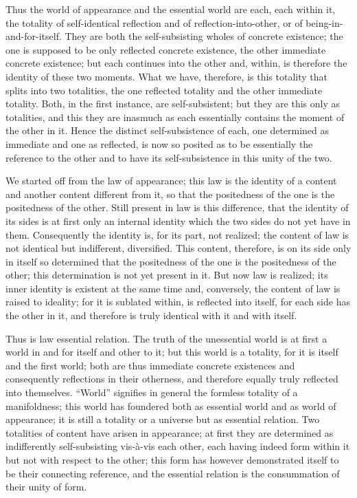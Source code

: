 Thus the world of appearance and the essential world are
each, each within it, the totality of
self-identical reflection and of reflection-into-other,
or of being-in-and-for-itself.
They are both the self-subsisting wholes of concrete existence;
the one is supposed to be only reflected concrete existence,
the other immediate concrete existence;
but each continues into the other and, within, is
therefore the identity of these two moments.
What we have, therefore, is this totality
that splits into two totalities,
the one reflected totality and the other immediate totality.
Both, in the first instance, are self-subsistent;
but they are this only as totalities,
and this they are inasmuch as each essentially contains
the moment of the other in it.
Hence the distinct self-subsistence of each,
one determined as immediate and one as reflected,
is now so posited as to be essentially the reference to the other
and to have its self-subsistence in this unity of the two.

We started off from the law of appearance;
this law is the identity of a content and another content different from it,
so that the positedness of the one is the positedness of the other.
Still present in law is this difference,
that the identity of its sides is at first only an internal identity
which the two sides do not yet have in them.
Consequently the identity is, for its part, not realized;
the content of law is not identical but indifferent, diversified.
This content, therefore, is on its side only in itself so determined
that the positedness of the one is the positedness of the other;
this determination is not yet present in it.
But now law is realized; its inner identity is existent at the same time
and, conversely, the content of law is raised to ideality;
for it is sublated within, is reflected into itself,
for each side has the other in it,
and therefore is truly identical with it and with itself.

Thus is law essential relation.
The truth of the unessential world is at first
a world in and for itself and other to it;
but this world is a totality,
for it is itself and the first world;
both are thus immediate concrete existences
and consequently reflections in their otherness,
and therefore equally truly reflected into themselves.
“World” signifies in general the formless totality of a manifoldness;
this world has foundered both as essential world and as world of appearance;
it is still a totality or a universe but as essential relation.
Two totalities of content have arisen in appearance;
at first they are determined as
indifferently self-subsisting vis-à-vis each other,
each having indeed form within it
but not with respect to the other;
this form has however demonstrated
itself to be their connecting reference,
and the essential relation is
the consummation of their unity of form.

